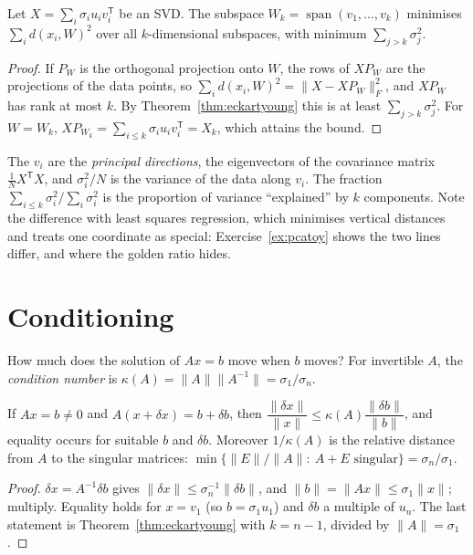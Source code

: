 \begin{theorem}\label{thm:pca}
Let $X=\sum_i\sigma_iu_iv_i^{\mathsf T}$ be an SVD. The subspace $W_k=\operatorname{span}(v_1,\dots,v_k)$ minimises
$\sum_id(x_i,W)^2$ over all $k$-dimensional subspaces, with minimum $\sum_{j>k}\sigma_j^2$.
\end{theorem}
\begin{proof}
If $P_W$ is the orthogonal projection onto $W$, the rows of $XP_W$ are the projections of the data points, so
$\sum_id(x_i,W)^2=\|X-XP_W\|_F^2$, and $XP_W$ has rank at most $k$. By Theorem~\ref{thm:eckartyoung} this is at least
$\sum_{j>k}\sigma_j^2$. For $W=W_k$, $XP_{W_k}=\sum_{i\le k}\sigma_iu_iv_i^{\mathsf T}=X_k$, which attains the bound.
\end{proof}

The $v_i$ are the \emph{principal directions}, the eigenvectors of the covariance matrix $\frac1NX^{\mathsf T}X$, and
$\sigma_i^2/N$ is the variance of the data along $v_i$. The fraction $\sum_{i\le k}\sigma_i^2/\sum_i\sigma_i^2$ is the
proportion of variance ``explained'' by $k$ components. Note the difference with least squares regression, which
minimises vertical distances and treats one coordinate as special: Exercise~\ref{ex:pcatoy} shows the two lines differ, and
where the golden ratio hides.

\section{Conditioning}

How much does the solution of $Ax=b$ move when $b$ moves? For invertible $A$, the \emph{condition number} is
$\kappa(A)=\|A\|\|A^{-1}\|=\sigma_1/\sigma_n$.

\begin{proposition}\label{prop:condition}
If $Ax=b\ne0$ and $A(x+\delta x)=b+\delta b$, then $\dfrac{\|\delta x\|}{\|x\|}\le\kappa(A)\dfrac{\|\delta b\|}{\|b\|}$, and equality
occurs for suitable $b$ and $\delta b$. Moreover $1/\kappa(A)$ is the relative distance from $A$ to the singular matrices:
$\min\{\|E\|/\|A\|:\ A+E\text{ singular}\}=\sigma_n/\sigma_1$.
\end{proposition}
\begin{proof}
$\delta x=A^{-1}\delta b$ gives $\|\delta x\|\le\sigma_n^{-1}\|\delta b\|$, and $\|b\|=\|Ax\|\le\sigma_1\|x\|$; multiply. Equality
holds for $x=v_1$ (so $b=\sigma_1u_1$) and $\delta b$ a multiple of $u_n$. The last statement is Theorem~\ref{thm:eckartyoung}
with $k=n-1$, divided by $\|A\|=\sigma_1$.
\end{proof}

